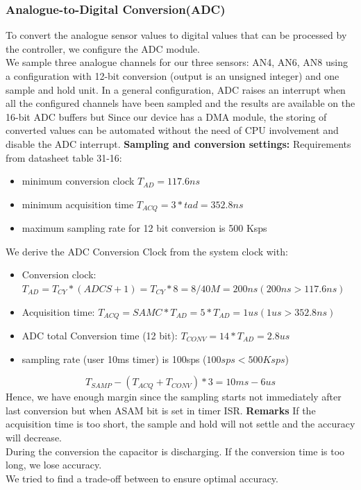 \subsubsection*{Analogue-to-Digital Conversion(ADC)}

To convert the analogue sensor values to digital values that can be processed by the controller, we configure the ADC module. \\
We sample three analogue channels for our three sensors: AN4, AN6, AN8 using a configuration with 12-bit conversion (output is an unsigned integer) and one sample and hold unit.
\vskip 0.1in
\noindent
In a general configuration, ADC raises an interrupt when all the configured channels have been sampled and the results are available on the 16-bit ADC buffers but Since our device has a DMA module, the storing of converted values can be automated without the need of CPU involvement and disable the ADC interrupt.
\vskip 0.1in
\noindent
\textbf{Sampling and conversion settings:}
\vskip 0.1in
\noindent
Requirements from datasheet table 31-16:
\begin{itemize}
    \item minimum conversion clock $T_{AD} = 117.6 ns$
    \item minimum acquisition time $T_{ACQ}=3*tad= 352.8ns $
    \item maximum sampling rate for 12 bit conversion is 500 Ksps
\end{itemize}
\vskip 0.1in
\noindent
We derive the ADC Conversion Clock from the system clock with:
\begin{itemize}
    \item Conversion clock: $T_{AD}=T_{CY}*(ADCS+1)= T_{CY}*8 = 8/40M= 200ns (200ns>117.6ns)$
    \item Acquisition time: $T_{ACQ}= SAMC*T_{AD}= 5*T_{AD}=1us (1us>352.8ns)$
    \item ADC total Conversion time (12 bit): $T_{CONV}=14*T_{AD}=2.8us$
    \item sampling rate (user 10ms timer) is 100sps ($100sps < 500Ksps$)
\end{itemize}
$$T_{SAMP}-(T_{ACQ}+T_{CONV})*3=10ms-6us$$
Hence, we have enough margin since the sampling starts not immediately after last conversion but when ASAM bit is set in timer ISR.
\vskip 0.2in
\noindent
\textbf{Remarks}
\vskip 0.1in
\noindent
If the acquisition time is too short, the sample and hold will not settle and the accuracy will decrease.\\
During the conversion the capacitor is discharging. If the conversion time is too long, we lose accuracy. \\
We tried to find a trade-off between to ensure optimal accuracy.

